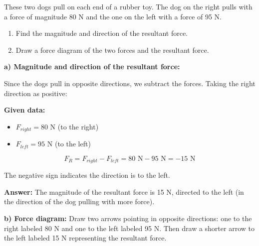 \begin{exercise}
    These two dogs pull on each end of a rubber toy.
    The dog on the right pulls with a force of magnitude 80 N and the one on the left with a force of 95 N.
    \begin{enumerate}[label=\letraminuscula]
        \item Find the magnitude and direction of the resultant force.
        \item Draw a force diagram of the two forces and
        the resultant force.
    \end{enumerate}


    \begin{solu}
        \textbf{a) Magnitude and direction of the resultant force:}

        Since the dogs pull in opposite directions, we subtract the forces. Taking the right direction as positive:

        \textbf{Given data:}
        \begin{itemize}
            \item $F_{right} = 80$ N (to the right)
            \item $F_{left} = 95$ N (to the left)
        \end{itemize}

        $$F_R = F_{right} - F_{left} = 80\text{ N} - 95\text{ N} = -15\text{ N}$$

        The negative sign indicates the direction is to the left.

        \textbf{Answer:} The magnitude of the resultant force is 15 N, directed to the left (in the direction of the dog pulling with more force).

        \textbf{b) Force diagram:} Draw two arrows pointing in opposite directions: one to the right labeled 80 N and one to the left labeled 95 N. Then draw a shorter arrow to the left labeled 15 N representing the resultant force.
    \end{solu}
\end{exercise}




